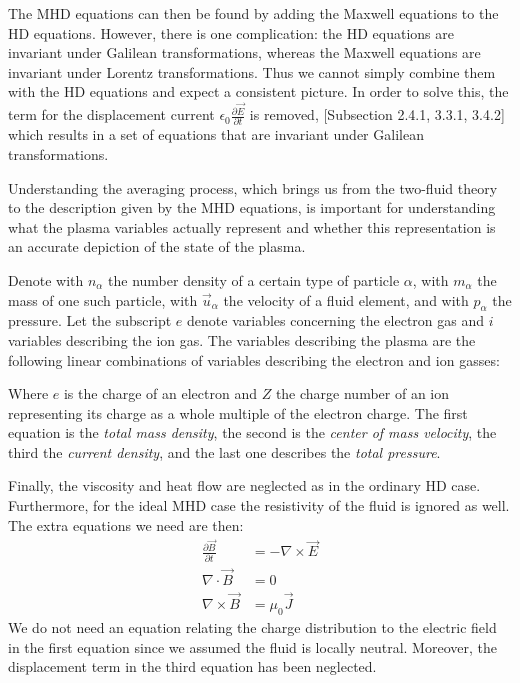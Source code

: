 The MHD equations can then be found by adding the Maxwell equations to the HD equations. However, there is one complication: the HD equations are invariant under Galilean transformations, whereas the Maxwell equations are invariant under Lorentz transformations. Thus we cannot simply combine them with the HD equations and expect a consistent picture.
In order to solve this, the term for the displacement current $\epsilon_0 \frac{\partial \vec{E}}{\partial t}$ is removed, \cite{notes-principles-MHD}[Subsection 2.4.1, 3.3.1, 3.4.2] which results in a set of equations that are invariant under Galilean transformations.

Understanding the averaging process, which brings us from the two-fluid theory to the description given by the MHD equations, is important for understanding what the plasma variables actually represent and whether this representation is an accurate depiction of the state of the plasma.

Denote with $n_\alpha$ the number density of a certain type of particle $\alpha$, with $m_\alpha$ the mass of one such particle, with $\vec{u}_\alpha$ the velocity of a fluid element, and with $p_\alpha$ the pressure.  Let the subscript $e$ denote variables concerning the electron gas and $i$ variables describing the ion gas. The variables describing the plasma are the following linear combinations of variables describing the electron and ion gasses:

{\centering 
\noindent {}
\par}

Where $e$ is the charge of an electron and $Z$ the charge number of an ion representing its charge as a whole multiple of the electron charge. The first equation is the \emph{total mass density}, the second is the \emph{center of mass velocity}, the third the \emph{current density}, and the last one describes the \emph{total pressure}.

Finally, the viscosity and heat flow are neglected as in the ordinary HD case. Furthermore, for the ideal MHD case the resistivity of the fluid is ignored as well. The extra equations we need are then:
\begin{align*}
	\frac{\partial \vec{B}}{\partial t} &= - \nabla \times \vec{E}\\
	\nabla \cdot \vec{B} &= 0\\
	\nabla \times \vec{B} &= \mu_0 \vec{J}
\end{align*}
We do not need an equation relating the charge distribution to the electric field in the first equation since we assumed the fluid is locally neutral. Moreover, the displacement term in the third equation has been neglected.

